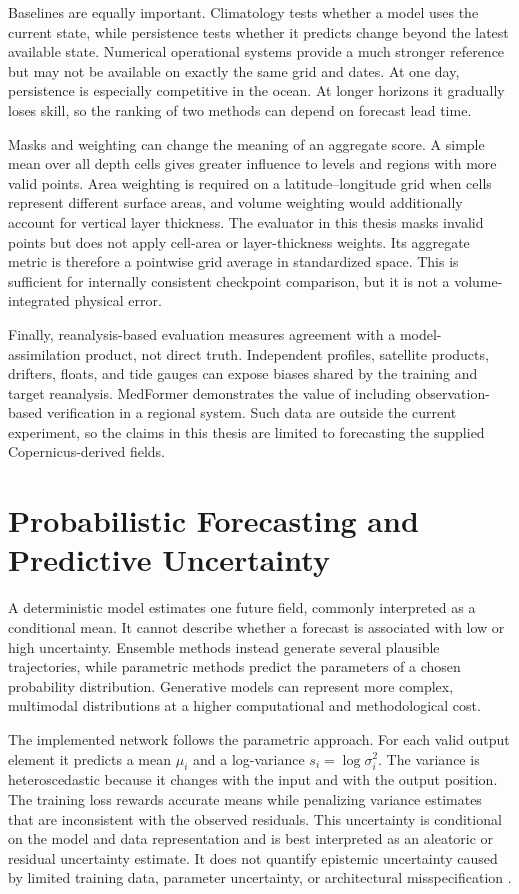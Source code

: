 Baselines are equally important. Climatology tests whether a model uses the current state, while persistence tests whether it predicts change beyond the latest available state. Numerical operational systems provide a much stronger reference but may not be available on exactly the same grid and dates. At one day, persistence is especially competitive in the ocean. At longer horizons it gradually loses skill, so the ranking of two methods can depend on forecast lead time.

Masks and weighting can change the meaning of an aggregate score. A simple mean over all depth cells gives greater influence to levels and regions with more valid points. Area weighting is required on a latitude--longitude grid when cells represent different surface areas, and volume weighting would additionally account for vertical layer thickness. The evaluator in this thesis masks invalid points but does not apply cell-area or layer-thickness weights. Its aggregate metric is therefore a pointwise grid average in standardized space. This is sufficient for internally consistent checkpoint comparison, but it is not a volume-integrated physical error.

Finally, reanalysis-based evaluation measures agreement with a model-assimilation product, not direct truth. Independent profiles, satellite products, drifters, floats, and tide gauges can expose biases shared by the training and target reanalysis. MedFormer demonstrates the value of including observation-based verification in a regional system. Such data are outside the current experiment, so the claims in this thesis are limited to forecasting the supplied Copernicus-derived fields.

\section{Probabilistic Forecasting and Predictive Uncertainty}

A deterministic model estimates one future field, commonly interpreted as a conditional mean. It cannot describe whether a forecast is associated with low or high uncertainty. Ensemble methods instead generate several plausible trajectories, while parametric methods predict the parameters of a chosen probability distribution. Generative models can represent more complex, multimodal distributions at a higher computational and methodological cost.

The implemented network follows the parametric approach. For each valid output element it predicts a mean $\mu_i$ and a log-variance $s_i=\log\sigma_i^2$. The variance is heteroscedastic because it changes with the input and with the output position. The training loss rewards accurate means while penalizing variance estimates that are inconsistent with the observed residuals. This uncertainty is conditional on the model and data representation and is best interpreted as an aleatoric or residual uncertainty estimate. It does not quantify epistemic uncertainty caused by limited training data, parameter uncertainty, or architectural misspecification \citep{kendall2017uncertainties}.

